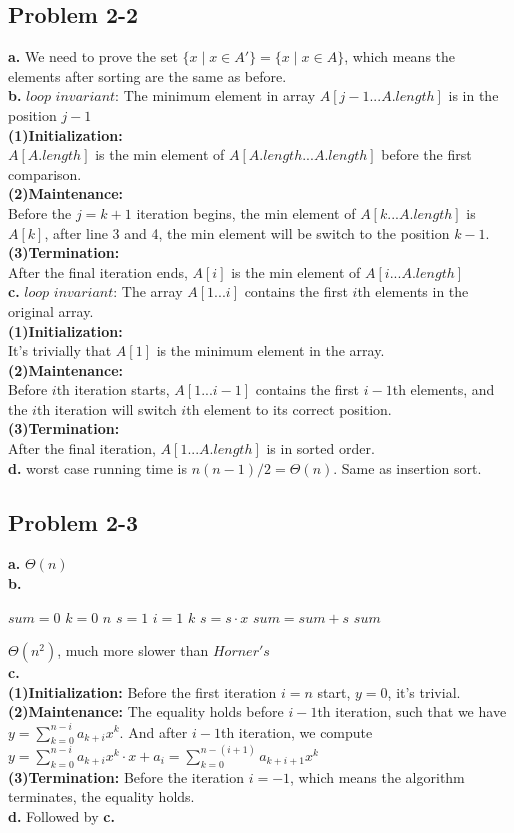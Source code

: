 \documentclass[12pt]{article}
\theoremstyle{definition}
\theoremstyle{remark}
\begin{document}
\subsection*{Problem 2-2}
\textbf{a.} We need to prove the set $\{x\mid x\in A'\}=\{x\mid x\in A\}$, which means the elements after sorting are the same as before.\\
\textbf{b.} $loop$ $invariant$: The minimum element in array $A[j-1...A.length]$ is in the position $j-1$\\
\textbf{(1)Initialization:}\\$A[A.length]$ is the min element of $A[A.length...A.length]$ before the first comparison.\\
\textbf{(2)Maintenance:}\\Before the $j=k+1$ iteration begins, the min element of $A[k...A.length]$ is $A[k]$, after line 3 and 4, the min element will be switch to the position $k-1$.\\
\textbf{(3)Termination:}\\After the final iteration ends, $A[i]$ is the min element of $A[i...A.length]$\\
\textbf{c.} $loop$ $invariant$: The array $A[1...i]$ contains the first $i$th elements in the original array.\\
\textbf{(1)Initialization:}\\It's trivially that $A[1]$ is the minimum element in the array.\\
\textbf{(2)Maintenance:}\\Before $i$th iteration starts, $A[1...i-1]$ contains the first $i-1$th elements, and the $i$th iteration will switch $i$th element to its correct position.\\
\textbf{(3)Termination:}\\After the final iteration, $A[1...A.length]$ is in sorted order.\\
\textbf{d.} worst case running time is $n(n-1)/2=\Theta(n)$. Same as insertion sort.
\subsection*{Problem 2-3}
\textbf{a.} $\Theta(n)$\\
\textbf{b.}
\begin{codebox}
\li $sum=0$
\li \For $k = 0$ \To $n$ \label{li:for}
\li \quad $s=1$
\li \quad \For $i = 1$ \To $k$ \label{li:for}
\li \qquad $s=s\cdot x$
\li \quad $sum=sum+s$
\li \Return $sum$
\end{codebox}
$\Theta(n^2)$, much more slower than $Horner's$\\
\textbf{c.}\\
\textbf{(1)Initialization:} Before the first iteration $i=n$ start, $y=0$, it's trivial.\\
\textbf{(2)Maintenance:} The equality holds before $i-1$th iteration, such that we have $y=\sum_{k=0}^{n-i}a_{k+i}x^k$. And after $i-1$th iteration, we compute $y=\sum_{k=0}^{n-i}a_{k+i}x^k\cdot x+a_i=\sum_{k=0}^{n-(i+1)}a_{k+i+1}x^k$\\
\textbf{(3)Termination:} Before the iteration $i=-1$, which means the algorithm terminates, the equality holds.\\
\textbf{d.} Followed by \textbf{c.}
\end{document}

